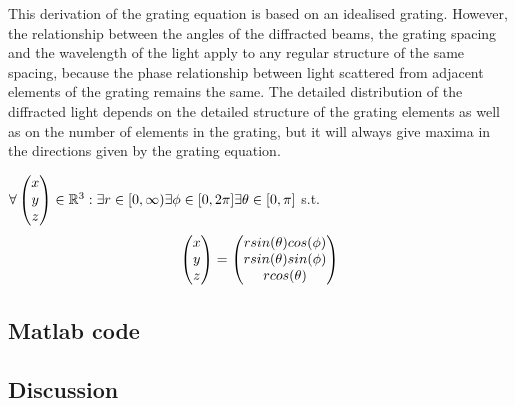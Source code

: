 This derivation of the grating equation is based on an idealised grating. However, the relationship between the angles of the diffracted beams, the grating spacing and the wavelength of the light apply to any regular structure of the same spacing, because the phase relationship between light scattered from adjacent elements of the grating remains the same. The detailed distribution of the diffracted light depends on the detailed structure of the grating elements as well as on the number of elements in the grating, but it will always give maxima in the directions given by the grating equation.


$\forall \colvec[x]{y}{z} \in \mathbb{R}^3 : \exists r \in [0,\infty) \exists \phi \in [0,2\pi] \exists \theta \in [0,\pi] $ s.t.
\begin{equation*}
\colvec[x]{y}{z} = \colvec[r sin(\theta)cos(\phi)]{r sin(\theta)sin(\phi)}{r cos(\theta)}
\end{equation*}

\subsection{Matlab code}
\subsection{Discussion}


